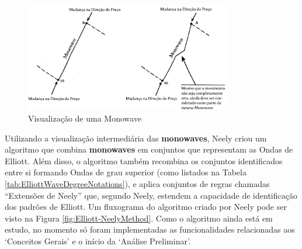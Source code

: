 \documentclass[12pt]{article}
\begin{document}
\begin{figure}[H]
	\centering
	\includegraphics[width=0.8\textwidth]{NeelyMonowave.png}
	\caption{Visualização de uma Monowave}\label{fig:NeelyMonowave}
\end{figure}

Utilizando a visualização intermediária das \textbf{monowaves}, Neely criou um algoritmo
que combina \textbf{monowaves} em conjuntos que representam as Ondas de Elliott. Além disso,
o algoritmo também recombina os conjuntos identificados entre si formando Ondas de grau
superior (como listados na Tabela \ref{tab:ElliottWaveDegreeNotations}), e aplica conjuntos
de regras chamadas ``Extensões de Neely'' que, segundo Neely, estendem a capacidade de
identificação dos padrões de Elliott. Um fluxograma do algoritmo criado por Neely pode ser
visto na Figura \ref{fig:Elliott-NeelyMethod}. Como o algoritmo ainda está em estudo, no
momento só foram implementadas as funcionalidades relacionadas aos `Conceitos Gerais' e
o início da `Análise Preliminar'.
\end{document}
